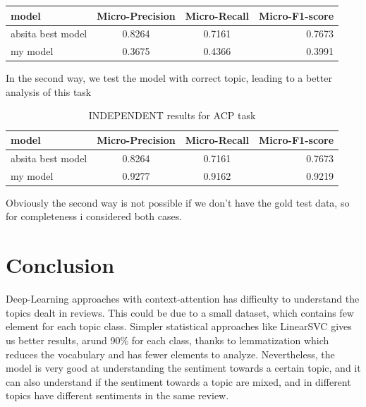 \documentclass{article}
\begin{document}
\begin{itemize}
\begin{table}[h!]
\begin{center}
\begin{tabular}{l|c|c|r}
                            \textbf{model} & \textbf{Micro-Precision} & \textbf{Micro-Recall} & \textbf{Micro-F1-score}\\
                            \hline
                                absita best model & 0.8264 & 0.7161 & 0.7673\\
                                my model & 0.3675 & 0.4366 & 0.3991\\
                        \end{tabular}
                    \end{center}
                \end{table}
                In the second way, we test the model with correct topic, leading to a better analysis of this task
                \begin{table}[h!]
                    \begin{center}
                        \caption{INDEPENDENT results for ACP task}
                        \label{tab:table4}
                        \begin{tabular}{l|c|c|r}
                            \textbf{model} & \textbf{Micro-Precision} & \textbf{Micro-Recall} & \textbf{Micro-F1-score}\\
                            \hline
                                absita best model & 0.8264 & 0.7161 & 0.7673\\
                                my model & 0.9277 & 0.9162 & 0.9219\\
                        \end{tabular}
                    \end{center}
                \end{table}
        \end{itemize}
        Obviously the second way is not possible if we don't have the gold test data, so for completeness i considered both cases.



    \section{Conclusion}\label{sec:s6}
        Deep-Learning approaches with context-attention has difficulty to understand the topics dealt in reviews.
        This could be due to a small dataset, which contains few element for each topic class.
        Simpler statistical approaches like LinearSVC gives us better results, arund 90\% for each class, thanks to lemmatization which reduces the vocabulary and has fewer elements to analyze.
        Nevertheless, the model is very good at understanding the sentiment towards a certain topic, and it can also understand if the sentiment towards a topic are mixed, and in different topics have different sentiments in the same review.
\end{document}

